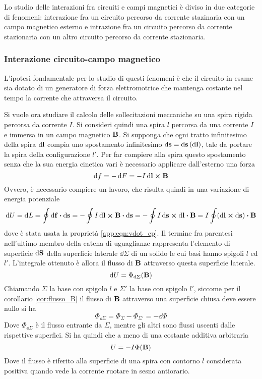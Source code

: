 Lo studio delle interazioni fra circuiti e campi magnetici è diviso in due categorie di fenomeni:
interazione fra un circuito percorso da corrente stazinaria con un campo magnetico esterno e
intrazione fra un circuito percorso da corrente stazionaria con un altro circuito percorso da corrente stazionaria.

\subsubsection{Interazione circuito-campo magnetico}
L'ipotesi fondamentale per lo studio di questi fenomeni è che il circuito in esame sia dotato di un generatore
di forza elettromotrice che mantenga costante nel tempo la corrente che attraversa il circuito.

Si vuole ora studiare il calcolo delle sollecitazioni meccaniche su una spira rigida percorsa da corrente $I$.
Si consideri quindi una spira $l$ percorsa da una corrente $I$ e immersa in un campo magnetico $\vb{B}$.
Si supponga che ogni tratto infinitesimo della spira $\dd{\vb{l}}$ compia uno spostamento infinitesimo
$\dd{\vb{s}}=\dd{\vb{s}}(\dd{\vb{l}})$, tale da portare la spira della configurazione $l'$.
Per far compiere alla spira questo spostamento senza che la sua energia cinetica vari è necessario applicare dall'esterno una forza
\[
    \dd{f}=-\dd{F}=-I\dd{\vb{l}}\cp\vb{B}
\]
Ovvero, è necessario compiere un lavoro, che risulta quindi in una variazione di energia potenziale
\[
    \dd{U}=\dd{L}=\oint\dd{\vb{f}}\vdot\dd{\vb{s}}=-\oint I\dd{\vb{l}}\cp\vb{B}\vdot\dd{\vb{s}}=
    -\oint I\dd{\vb{s}}\cp\dd{\vb{l}}\vdot\vb{B}=I\oint(\dd{\vb{l}}\cp\dd{\vb{s}})\vdot\vb{B}
\]
dove è stata usata la proprietà \eqref{app:eqn:vdot_cp}.
Il termine fra parentesi nell'ultimo membro della catena di uguaglianze rappresenta l'elemento di superficie $\dd{\vb{S}}$
della superficie laterale $\dd{\Sigma}$ di un solido le cui basi hanno spigoli $l$ ed $l'$.
L'integrale ottenuto è allora il flusso di $\vb{B}$ attraverso questa superficie laterale.
\[
    \dd{U}=\Phi_{\dd{\Sigma}}(\vb{B})
\]
Chiamando $\Sigma$ la base con spigolo $l$ e $\Sigma'$ la base con spigolo $l'$, siccome per il corollario \ref{cor:flusso_B}
il flusso di $\vb{B}$ attraverso una superficie chiusa deve essere nullo si ha
\[
    \Phi_{\dd{\Sigma}}=\Phi_\Sigma-\Phi_{\Sigma'}=-\dd{\Phi}
\]
Dove $\Phi_{\dd{\Sigma}}$ è il flusso entrante da $\Sigma$, mentre gli altri sono flussi uscenti dalle rispettive superfici.
Si ha quindi che a meno di una costante additiva arbitraria
\[
    U=-I\Phi(\vb{B})
\]
Dove il flusso è riferito alla superficie di una spira con contorno $l$ considerata positiva quando vede la corrente ruotare in sesno antiorario.
